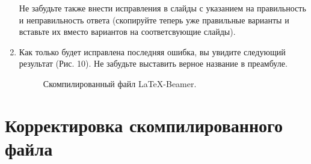 \documentclass[11pt, a4paper]{extarticle}
\begin{document}
\begin{enumerate}
	Не забудьте также внести исправления в слайды с указанием на правильность и неправильность ответа (скопируйте теперь уже правильные варианты и вставьте их вместо вариантов на соответсвующие слайды).
	
	\item Как только будет исправлена последняя ошибка, вы увидите следующий результат (Рис. 10). Не забудьте выставить верное название в преамбуле.
	
	\begin{figure}[h!]
		\centering
		\caption{Скомпилированный файл \LaTeX-Beamer.}
	\end{figure}

\end{enumerate}

\section{Корректировка скомпилированного файла}
\end{document}

